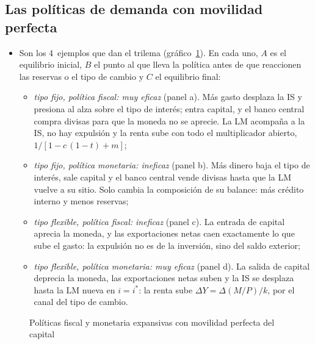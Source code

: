 \documentclass[11pt]{article}
\begin{document}
\subsection{Las políticas de demanda con movilidad perfecta}\label{anexo:is-lm-bp-politicas}

\begin{itemize}
\item Son los 4~ejemplos que dan el trilema (gráfico~\ref{fig:anexo-mundell-fleming}). En cada uno, $A$ es el equilibrio inicial, $B$ el punto al que lleva la política antes de que reaccionen las reservas o el tipo de cambio y $C$ el equilibrio final:
  \begin{itemize}
  \item \emph{tipo fijo, política fiscal: muy eficaz} (panel a). Más gasto desplaza la IS y presiona al alza sobre el tipo de interés; entra capital, y el banco central compra divisas para que la moneda no se aprecie. La LM acompaña a la IS, no hay expulsión y la renta sube con todo el multiplicador abierto, $1/[1-c\,(1-t)+m]$;
  \item \emph{tipo fijo, política monetaria: ineficaz} (panel b). Más dinero baja el tipo de interés, sale capital y el banco central vende divisas hasta que la LM vuelve a su sitio. Solo cambia la composición de su balance: más crédito interno y menos reservas;
  \item \emph{tipo flexible, política fiscal: ineficaz} (panel c). La entrada de capital aprecia la moneda, y las exportaciones netas caen exactamente lo que sube el gasto: la expulsión no es de la inversión, sino del saldo exterior;
  \item \emph{tipo flexible, política monetaria: muy eficaz} (panel d). La salida de capital deprecia la moneda, las exportaciones netas suben y la IS se desplaza hasta la LM nueva en $i=i^*$: la renta sube $\Delta Y=\Delta(M/P)/k$, por el canal del tipo de cambio.
  \end{itemize}
\end{itemize}

\begin{figure}[H]
\centering
\caption{Políticas fiscal y monetaria expansivas con movilidad perfecta del capital}\label{fig:anexo-mundell-fleming}
\end{figure}
\end{document}

